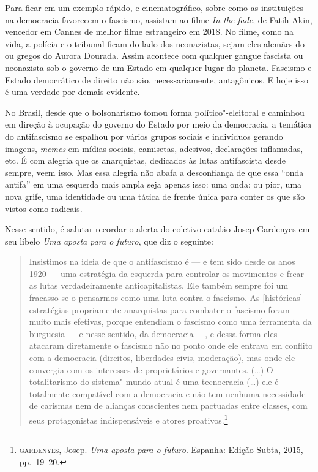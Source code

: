 Para ficar em um exemplo rápido, e cinematográfico, sobre como as instituições na democracia favorecem o fascismo, assistam ao filme \emph{In the fade}, de Fatih Akin, vencedor em Cannes de melhor filme estrangeiro em 2018. No filme, como na vida, a polícia e o tribunal ficam do lado dos neonazistas, sejam eles alemães do  ou gregos do Aurora Dourada. Assim acontece com qualquer gangue fascista ou neonazista sob o governo de um Estado em qualquer lugar do planeta. Fascismo e Estado democrático de direito não são, necessariamente, antagônicos. E hoje isso é uma verdade por demais evidente.

No Brasil, desde que o bolsonarismo tomou forma político"-eleitoral e caminhou em direção à ocupação do governo do Estado por meio da democracia, a temática do antifascismo se espalhou por vários grupos sociais e indivíduos gerando imagens, \emph{memes} em mídias sociais, camisetas, adesivos, declarações inflamadas, etc. É com alegria que os anarquistas, dedicados às lutas antifascista desde sempre, veem isso. Mas essa alegria não abafa a desconfiança de que essa ``onda antifa'' em uma esquerda mais ampla seja apenas isso: uma onda; ou pior, uma nova grife, uma identidade ou uma tática de frente única para conter os que são vistos como radicais.

Nesse sentido, é salutar recordar o alerta do coletivo catalão Josep Gardenyes em seu libelo \emph{Uma aposta para o futuro}, que diz o seguinte: 

\begin{quote}
Insistimos na ideia de que o antifascismo é --- e tem sido desde os anos 1920 --- uma estratégia da esquerda para controlar os movimentos e frear as lutas verdadeiramente anticapitalistas. Ele também sempre foi um fracasso se o pensarmos como uma luta contra o fascismo. As [históricas] estratégias propriamente anarquistas para combater o fascismo foram muito mais efetivas, porque entendiam o fascismo como uma ferramenta da burguesia --- e nesse sentido, da democracia ---, e dessa forma eles atacaram diretamente o fascismo não no ponto onde ele entrava em conflito com a democracia (direitos, liberdades civis, moderação), mas onde ele convergia com os interesses de proprietários e governantes. (\ldots{}) O totalitarismo do sistema"-mundo atual é uma tecnocracia (\ldots{}) ele é totalmente compatível com a democracia e não tem nenhuma necessidade de carismas nem de alianças conscientes nem pactuadas entre classes, com seus protagonistas indispensáveis e atores proativos.\footnote{\textsc{gardenyes}, Josep. \emph{Uma aposta para o futuro}. Espanha: Edição Subta, 2015, pp.~19--20.}
\end{quote}

